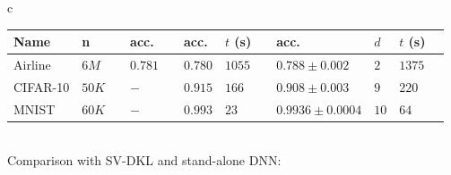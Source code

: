 \documentclass[a0,portrait]{a0poster}
\begin{document}
\begin{multicols}{2}
\begin{center}
\begin{tabular}{c}
\begin{tabular}{lll ll llll lll}
      \cmidrule{1-2}
      \cmidrule{4-4}
      \cmidrule{6-7}
      \cmidrule{9-11}

      Name & n &&
      acc. && acc. & $t$ (s) &&
      acc. & $d$ & $t$ (s)
      \\
      \midrule



      Airline & $6M$ && 
      $0.781$ && $0.780$ & $1055$ &&
      $\mathbf{0.788 \pm 0.002}$ & $2$ & $1375$\\

      CIFAR-10 & $50 K$ && 
      $-$ && $\mathbf{0.915}$ & $166$ &&
      $0.908 \pm 0.003$ & $9$ & $220$\\

      MNIST & $60K$ && 
      $-$ && $0.993$ & $23$ &&
      $\mathbf{0.9936 \pm 0.0004}$ & $10$ & $64$\\
      \bottomrule
    \end{tabular}
  \\
  Comparison with SV-DKL \citep{wilson2016stochastic} and stand-alone
  DNN:

\end{tabular}
\end{center}






\end{multicols}
\end{document}
